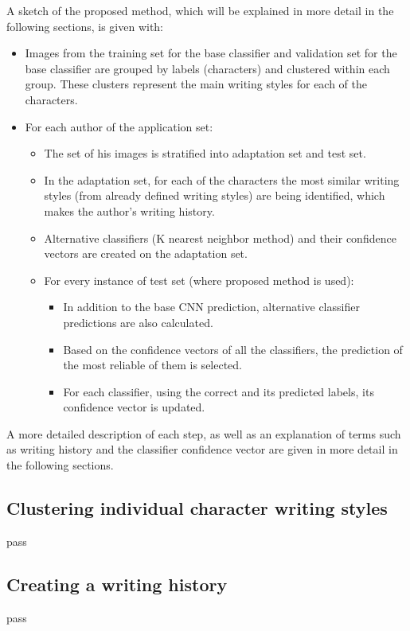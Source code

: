 \documentclass{article}
\begin{document}
A sketch of the proposed method, which will be explained in more detail in the following sections, is given with: 
\begin{itemize}
  \item Images from the training set for the base classifier and validation set for the base classifier are grouped by labels (characters) and clustered within each group. 
  These clusters represent the main writing styles for each of the characters.
  \item For each author of the application set: 
  \begin{itemize}
    \item The set of his images is stratified into adaptation set and test set. 
    \item In the adaptation set, for each of the characters the most similar writing styles (from already defined writing styles) are being identified, which makes the author's writing history. 
    \item Alternative classifiers (K nearest neighbor method) and their confidence vectors are created on the adaptation set. 
    \item For every instance of test set (where proposed method is used):
      \begin{itemize}
        \item In addition to the base CNN prediction, alternative classifier predictions are also calculated.
        \item Based on the confidence vectors of all the classifiers, the prediction of the most reliable of them is selected. 
        \item For each classifier, using the correct and its predicted labels, its confidence vector is updated. 
      \end{itemize}
  \end{itemize}
\end{itemize}
A more detailed description of each step, as well as an explanation of terms such as writing history and the classifier confidence vector are given in more detail in the following sections. 


\subsection{Clustering individual character writing styles}
pass 

\subsection{Creating a writing history}
pass
\end{document}
